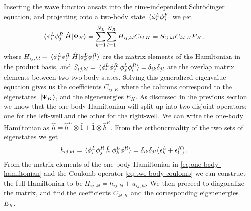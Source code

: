 \documentclass[twocolumn,superscriptaddress,unsortedaddress,
 amsmath,amssymb,
 aps,
]{revtex4-2}
\begin{document}
        Inserting the wave function ansatz into the time-independent Schrödinger
        equation, and projecting onto a two-body state
        $\bra*{\phi^L_i \phi^R_j}$ we get
        \begin{align*}
            \mel*{\phi^L_i \phi^R_j}{\hat{H}}{\Psi_K}
            &= \sum_{k = 1}^{N_L} \sum_{l = 1}^{N_R}
            H_{ij, kl} C_{kl, K}
            = S_{ij, kl} C_{kl, K} E_{K},
        \end{align*}
        where $H_{ij, kl} \equiv \mel*{\phi^L_i \phi^R_j}{\hat{H}}{
        \phi^L_k \phi^R_l}$ are the matrix elements of the Hamiltonian in
        the product basis, and $S_{ij, kl} = \braket*{
        \phi^L_i \phi^R_j}{\phi^L_k \phi^R_l} = \delta_{ik} \delta_{jl}$ are
        the overlap matrix elements between two two-body states.
        Solving this generalized eigenvalue equation gives us the
        coefficients $C_{ij, K}$ where the columns correspond to the
        eigenstates $\ket*{\Psi_K}$, and the eigenenergies $E_K$.
        As discussed in the previous section we know that the one-body Hamiltonian
        will split up into two disjoint operators; one for the left-well and the
        other for the right-well.
        We can write the one-body Hamiltonian as $\hat{h} = \hat{h}^L \otimes \hat{1}
        + \hat{1} \otimes \hat{h}^{R}$.
        From the orthonormality of the two sets of eigenstates we get
        \begin{align}
            h_{ij, kl}
            &= \mel*{\phi^L_i \phi^R_j}{\hat{h}}{\phi^L_k \phi^R_l}
            = \delta_{ik} \delta_{jl} \qty(
                \epsilon^L_k
                + \epsilon^{R}_l
            ).
            \label{eq:one-body-hamiltonian}
        \end{align}
        From the matrix elements of the one-body Hamiltonian in
        \eqref{eq:one-body-hamiltonian} and the Coulomb operator
        \eqref{eq:two-body-coulomb} we can construct the full Hamiltonian
        to be $H_{ij, kl} = h_{ij, kl} + u_{ij, kl}$.
        We then proceed to diagonalize the matrix, and find the coefficients
        $C_{kl, K}$ and the corresponding eigenenergies $E_K$.
\end{document}
